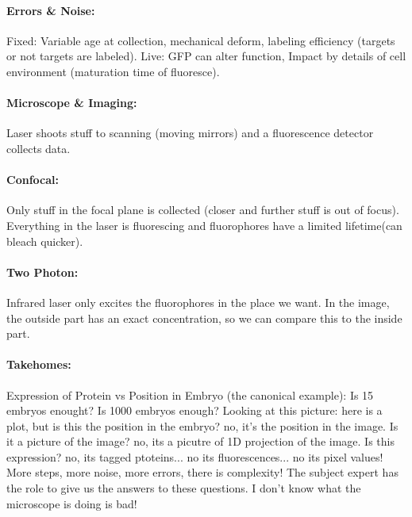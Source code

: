 \documentclass[../main.tex]{subfiles}
\begin{document}
\paragraph*{Errors \& Noise:} Fixed: Variable age at collection, mechanical deform, labeling efficiency
(targets or not targets are labeled). Live: GFP can alter function, Impact by details of cell
environment (maturation time of fluoresce). 

\paragraph*{Microscope \& Imaging:} Laser shoots stuff to scanning (moving mirrors) and a
fluorescence detector collects data. 

\paragraph*{Confocal:} Only stuff in the focal plane is collected (closer and further stuff is out
of focus). Everything in the laser is fluorescing and fluorophores have a limited lifetime(can 
bleach quicker).

\paragraph*{Two Photon:} Infrared laser only excites the fluorophores in the place we want. In the
image, the outside part has an exact concentration, so we can compare this to the inside part.

\paragraph*{Takehomes:} Expression of Protein vs Position in Embryo (the canonical example): Is
15 embryos enought? Is 1000 embryos enough? Looking at this picture: here is a plot, but is this
the position in the embryo? no, it's the position in the image. Is it a picture of the image? no,
its a picutre of 1D projection of the image. Is this expression? no, its tagged ptoteins... no its
fluorescences... no its pixel values! More steps, more noise, more errors, there is complexity! 
The subject expert has the role to give us the answers to these questions. I don't know what the
microscope is doing is bad!
\end{document}

